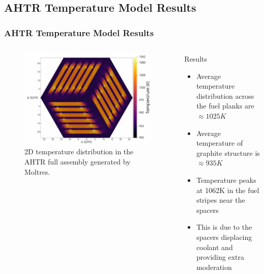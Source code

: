\subsection{AHTR Temperature Model Results}
\begin{frame}
    \frametitle{AHTR Temperature Model Results}
    \begin{columns}
        \begin{column}{0.6\textwidth}
            \begin{figure}[]
                \centering
                \includegraphics[width=\linewidth]{../docs/figures/benchmark-temperature-model.png} 
                \caption{2D temperature distribution in the \acrfull{AHTR}
                full assembly generated by Moltres.}
            \end{figure}
        \end{column}
        \begin{column}{0.4\textwidth} 
            \begin{block}{Results}
                \begin{itemize}
                    \item Average temperature distribution across the fuel planks are 
                    $\approx 1025K$
                    \item Average temperature of graphite structure is $\approx 935K$
                    \item Temperature peaks at 1062K in the fuel stripes near the spacers
                    \item This is due to the spacers displacing coolant and providing extra 
                    moderation 
                \end{itemize}
            \end{block}
        \end{column}
        \end{columns}
\end{frame}

